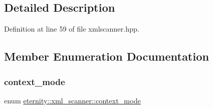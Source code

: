 \subsection{Detailed Description}


Definition at line 59 of file xmlscanner.\+hpp.



\subsection{Member Enumeration Documentation}
\mbox{\label{classeternity_1_1xml__scanner_a97fff18c2e2004f157a42001010b84cf}} 
\subsubsection{\texorpdfstring{context\+\_\+mode}{context\_mode}}
{\footnotesize\ttfamily enum \hyperlink{classeternity_1_1xml__scanner_a97fff18c2e2004f157a42001010b84cf}{eternity\+::xml\+\_\+scanner\+::context\+\_\+mode}\hspace{0.3cm}{\ttfamily [private]}}

